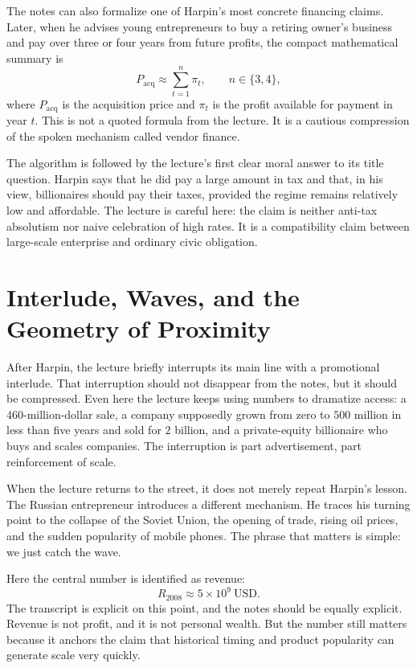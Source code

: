 The notes can also formalize one of Harpin's most concrete financing claims. Later, when he advises young entrepreneurs to buy a retiring owner's business and pay over three or four years from future profits, the compact mathematical summary is
\begin{equation}
P_{\mathrm{acq}} \approx \sum_{t=1}^{n}\pi_t,
\qquad
n\in\{3,4\},
\end{equation}
where \(P_{\mathrm{acq}}\) is the acquisition price and \(\pi_t\) is the profit available for payment in year \(t\). This is not a quoted formula from the lecture. It is a cautious compression of the spoken mechanism called vendor finance.

The algorithm is followed by the lecture's first clear moral answer to its title question. Harpin says that he did pay a large amount in tax and that, in his view, billionaires should pay their taxes, provided the regime remains relatively low and affordable. The lecture is careful here: the claim is neither anti-tax absolutism nor naive celebration of high rates. It is a compatibility claim between large-scale enterprise and ordinary civic obligation.

\section{Interlude, Waves, and the Geometry of Proximity}

After Harpin, the lecture briefly interrupts its main line with a promotional interlude. That interruption should not disappear from the notes, but it should be compressed. Even here the lecture keeps using numbers to dramatize access: a \(460\)-million-dollar sale, a company supposedly grown from zero to \(500\) million in less than five years and sold for \(2\) billion, and a private-equity billionaire who buys and scales companies. The interruption is part advertisement, part reinforcement of scale.

When the lecture returns to the street, it does not merely repeat Harpin's lesson. The Russian entrepreneur introduces a different mechanism. He traces his turning point to the collapse of the Soviet Union, the opening of trade, rising oil prices, and the sudden popularity of mobile phones. The phrase that matters is simple: we just catch the wave.

Here the central number is identified as revenue:
\begin{equation}
R_{2008} \approx 5\times 10^{9}\ \mathrm{USD}.
\end{equation}
The transcript is explicit on this point, and the notes should be equally explicit. Revenue is not profit, and it is not personal wealth. But the number still matters because it anchors the claim that historical timing and product popularity can generate scale very quickly.

